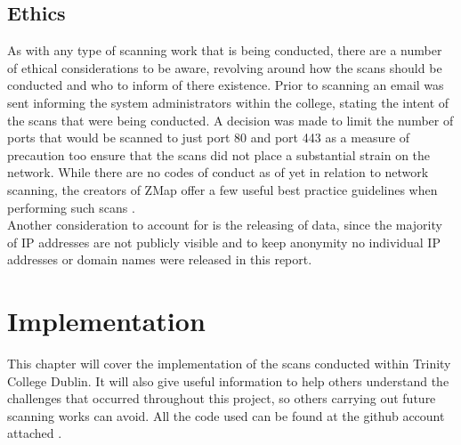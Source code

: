 \documentclass[a4wide,leqno,12pt]{report}
\begin{document}
\section{Ethics}
As with any type of scanning work that is being conducted, there are a number of ethical considerations to be aware, revolving around how the scans should be conducted and who to inform of there existence. Prior to scanning an email was sent informing the system administrators within the college, stating the intent of the scans that were being conducted. A decision was made to limit the number of ports that would be scanned to just port 80 and port 443 as a measure of precaution too ensure that the scans did not place a substantial strain on the network. While there are no codes of conduct as of yet in relation to network scanning, the creators of ZMap offer a few useful best practice guidelines when performing such scans\cite{durumeric2015search} \cite{durumeric2013zmap}.\\

Another consideration to account for is the releasing of data, since the majority of IP addresses are not publicly visible and to keep anonymity no individual IP addresses or domain names were released in this report.
\chapter{Implementation}
This chapter will cover the implementation of the scans conducted within Trinity College Dublin. It will also give useful information to help others understand the challenges that occurred throughout this project, so others carrying out future scanning works can avoid. All the code used can be found at the github account attached \cite{michaelGithub}.
\end{document}
